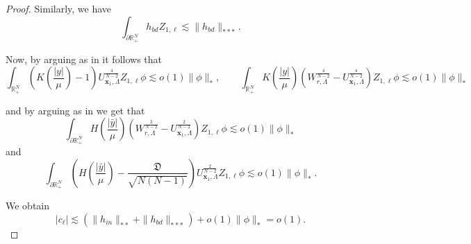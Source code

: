 \documentclass[11pt,a4paper]{amsart}
\begin{document}
\begin{proof}
Similarly, we have
$$\int_{\partial\mathbb R^N_+}h_{bd}Z_{1, \ell}\lesssim \|h_{bd}\|_{***}. $$


Now, by arguing as in \cite{WeiYan_2010a}
it follows that
$$\int_{\mathbb R^N_+}\left(K\left(\frac{|y|}{\mu}\right)-1\right)U_{\mathbf{x}_1,\Lambda}^{\frac{4}{N-2}}Z_{1, \ell}\phi\lesssim o(1)\|\phi\|_*, \qquad \int_{\mathbb R^N_+}K\left(\frac{|y|}{\mu}\right)\left(W_{r, \Lambda}^{\frac{4}{N-2}}-U_{\mathbf{x}_1,\Lambda}^{\frac{4}{N-2}}\right)Z_{1, \ell}\phi\lesssim o(1)\|\phi\|_*$$

and by arguing as in \cite{WangZhao_2013} we get that
$$\int_{\partial\mathbb R^N_+}H\left(\frac{|\bar y|}{\mu}\right)\left(W_{r, \Lambda}^{\frac{2}{N-2}}-U_{\mathbf{x}_1,\Lambda}^{\frac{2}{N-2}}\right)Z_{1, \ell}\phi\lesssim o(1)\|\phi\|_*$$ and $$ \int_{\partial\mathbb R^N_+}\left(H\left(\frac{|\bar y|}{\mu}\right)-\frac{\mathfrak D}{\sqrt{N(N-1)}}\right)U_{\mathbf{x}_1,\Lambda}^{\frac{2}{N-2}}Z_{1, \ell}\phi\lesssim o(1)\|\phi\|_*.$$




We obtain 
\begin{equation}\label{eq.c_ell_estimate}
|c_{\ell}|\lesssim \left(\|h_{in}\|_{**}+\|h_{bd}\|_{***}\right)+o(1)\|\phi\|_{*} = o(1).
\end{equation}


\end{proof}
\end{document}
